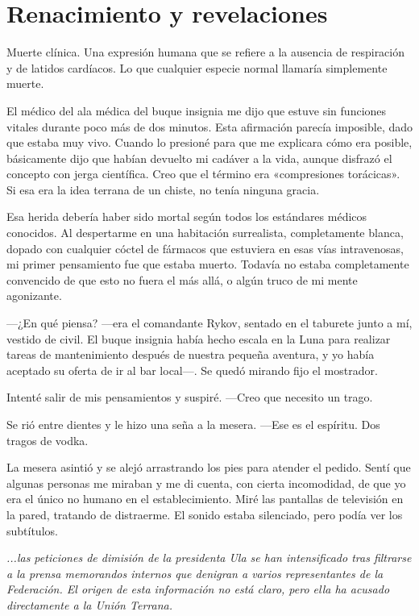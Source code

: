 \chapter{Renacimiento y revelaciones}\label{sec:renacimiento-y-revelaciones}

Muerte clínica. Una expresión humana que se refiere a la ausencia de respiración y de latidos cardíacos. Lo que cualquier especie normal llamaría simplemente muerte.

El médico del ala médica del buque insignia me dijo que estuve sin funciones vitales durante poco más de dos minutos. Esta afirmación parecía imposible, dado que estaba muy vivo. Cuando lo presioné para que me explicara cómo era posible, básicamente dijo que habían devuelto mi cadáver a la vida, aunque disfrazó el concepto con jerga científica. Creo que el término era «compresiones torácicas». Si esa era la idea terrana de un chiste, no tenía ninguna gracia.

Esa herida debería haber sido mortal según todos los estándares médicos conocidos. Al despertarme en una habitación surrealista, completamente blanca, dopado con cualquier cóctel de fármacos que estuviera en esas vías intravenosas, mi primer pensamiento fue que estaba muerto. Todavía no estaba completamente convencido de que esto no fuera el más allá, o algún truco de mi mente agonizante.

 —¿En qué piensa? —era el comandante Rykov, sentado en el taburete junto a mí, vestido de civil. El buque insignia había hecho escala en la Luna para realizar tareas de mantenimiento después de nuestra pequeña aventura, y yo había aceptado su oferta de ir al bar local—. Se quedó mirando fijo el mostrador.

Intenté salir de mis pensamientos y suspiré. —Creo que necesito un trago.

Se rió entre dientes y le hizo una seña a la mesera. —Ese es el espíritu. Dos tragos de vodka.

La mesera asintió y se alejó arrastrando los pies para atender el pedido. Sentí que algunas personas me miraban y me di cuenta, con cierta incomodidad, de que yo era el único no humano en el establecimiento. Miré las pantallas de televisión en la pared, tratando de distraerme. El sonido estaba silenciado, pero podía ver los subtítulos.

\textit{...las peticiones de dimisión de la presidenta Ula se han intensificado tras filtrarse a la prensa memorandos internos que denigran a varios representantes de la Federación. El origen de esta información no está claro, pero ella ha acusado directamente a la Unión Terrana.}

